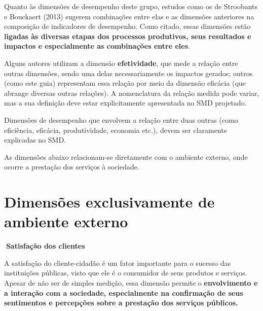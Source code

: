 \documentclass[
  letterpaper,
  DIV=11,
  numbers=noendperiod]{scrreprt}
\begin{document}
Quanto às dimensões de desempenho deste grupo, estudos como os de
Stroobants e Bouckaert (2013) sugerem combinações entre elas e as
dimensões anteriores na composição de indicadores de desempenho. Como
citado, essas dimensões estão \textbf{ligadas às diversas etapas dos
processos produtivos, seus resultados e impactos e especialmente as
combinações entre eles}.

Alguns autores utilizam a dimensão \textbf{efetividade}, que mede a
relação entre outras dimensões, sendo uma delas necessariamente os
impactos gerados; outros (como este guia) representam essa relação por
meio da dimensão eficácia (que abrange diversas outras relações). A
nomenclatura da relação medida pode variar, mas a sua definição deve
estar explicitamente apresentada no SMD projetado.

\begin{tcolorbox}[enhanced jigsaw, title=\textcolor{quarto-callout-tip-color}{\faLightbulb}\hspace{0.5em}{Dica}, bottomrule=.15mm, arc=.35mm, bottomtitle=1mm, toprule=.15mm, coltitle=black, opacityback=0, colback=white, rightrule=.15mm, breakable, toptitle=1mm, leftrule=.75mm, titlerule=0mm, opacitybacktitle=0.6, colbacktitle=quarto-callout-tip-color!10!white, left=2mm, colframe=quarto-callout-tip-color-frame]

Dimensões de desempenho que envolvem a relação entre duas outras (como
eficiência, eficácia, produtividade, economia etc.), devem ser
claramente explicadas no SMD.

\end{tcolorbox}

As dimensões abaixo relacionam-se diretamente com o ambiente externo,
onde ocorre a prestação dos serviços à sociedade.

\hypertarget{dimensuxf5es-exclusivamente-de-ambiente-externo}{%
\section{Dimensões exclusivamente de ambiente
externo}\label{dimensuxf5es-exclusivamente-de-ambiente-externo}}

\begin{tcolorbox}[enhanced jigsaw, bottomrule=.15mm, arc=.35mm, breakable, toprule=.15mm, rightrule=.15mm, opacityback=0, left=2mm, colback=white, leftrule=.75mm]

\textbf{🔽{Satisfação dos clientes}}\vspace{2mm}

A satisfação do cliente-cidadão é um fator importante para o sucesso das
instituições públicas, visto que ele é o consumidor de seus produtos e
serviços. Apesar de não ser de simples medição, essa dimensão permite o
\textbf{envolvimento e a interação com a sociedade, especialmente na
confirmação de seus sentimentos e percepções sobre a prestação dos
serviços públicos.}

\end{tcolorbox}
\end{document}
